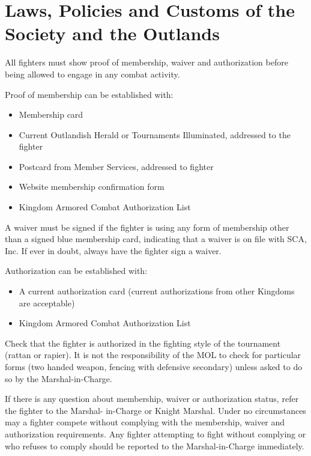 \documentclass{article}
\begin{document}
\section{Laws, Policies and Customs of the Society and the Outlands}
All fighters must show proof of membership, waiver and authorization
before being allowed to engage in any combat activity.


Proof of membership can be established with:
\begin{itemize}
\item Membership card

\item Current Outlandish Herald or Tournaments Illuminated, addressed to the fighter

\item Postcard from Member Services, addressed to fighter

\item Website membership confirmation form

\item Kingdom Armored Combat Authorization List
\end{itemize}
A waiver must be signed if the fighter is using any form of membership other than a
signed blue membership card, indicating that a waiver is on file with SCA, Inc. If ever in doubt, always have the
fighter sign a waiver.

Authorization can be established with:

\begin{itemize}
\item A current authorization card (current authorizations from other Kingdoms are acceptable)

\item Kingdom Armored Combat Authorization List
\end{itemize}

Check that the fighter is authorized in the fighting style of the tournament (rattan or rapier). It is not the
responsibility of the MOL to check for particular forms (two handed weapon, fencing with defensive
secondary) unless asked to do so by the Marshal-in-Charge.


If there is any question about membership, waiver or authorization status, refer the fighter to the Marshal-
in-Charge or Knight Marshal. Under no circumstances may a fighter compete without complying with the
membership, waiver and authorization requirements. Any fighter attempting to fight without complying
or who refuses to comply should be reported to the Marshal-in-Charge immediately.
\end{document}
